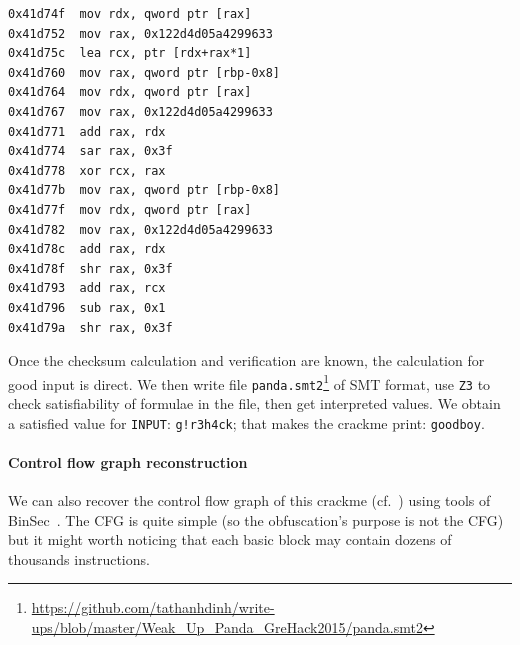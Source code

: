 \documentclass{easychair}
\begin{document}
\begin{lstlisting}[frame=lines, caption={Instructions verifying checksum}, captionpos=b, boxpos=b, language={[x86masm]Assembler}, label=lst:checksumverificationcode]
0x41d74f  mov rdx, qword ptr [rax]
0x41d752  mov rax, 0x122d4d05a4299633
0x41d75c  lea rcx, ptr [rdx+rax*1]
0x41d760  mov rax, qword ptr [rbp-0x8]
0x41d764  mov rdx, qword ptr [rax]
0x41d767  mov rax, 0x122d4d05a4299633
0x41d771  add rax, rdx
0x41d774  sar rax, 0x3f
0x41d778  xor rcx, rax
0x41d77b  mov rax, qword ptr [rbp-0x8]
0x41d77f  mov rdx, qword ptr [rax]
0x41d782  mov rax, 0x122d4d05a4299633
0x41d78c  add rax, rdx
0x41d78f  shr rax, 0x3f
0x41d793  add rax, rcx
0x41d796  sub rax, 0x1
0x41d79a  shr rax, 0x3f
\end{lstlisting}

Once the checksum calculation and verification are known, the calculation for good input is direct. We then write file \texttt{panda.smt2}\footnote{\url{https://github.com/tathanhdinh/write-ups/blob/master/Weak\_Up\_Panda\_GreHack2015/panda.smt2}} of SMT format, use \texttt{Z3} to check satisfiability of formulae in the file, then get interpreted values. We obtain a satisfied value for \texttt{INPUT}: \texttt{g!r3h4ck}; that makes the crackme print: \texttt{goodboy}.

\paragraph{Control flow graph reconstruction}
We can also recover the control flow graph of this crackme (cf.~) using tools of BinSec~\autocite{binsec}. The CFG is quite simple (so the obfuscation's purpose is not the CFG) but it might worth noticing that each basic block may contain dozens of thousands instructions.
\end{document}
